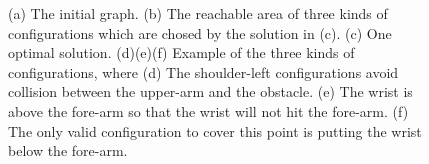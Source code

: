 \documentclass[journal]{IEEEtran}
\begin{document}
\begin{figure}[t]
\centering
{}
\caption{(a) The initial graph. (b) The reachable area of three kinds of configurations which are chosed by the solution in (c). (c) One optimal solution. (d)(e)(f) Example of the three kinds of configurations, where
(d) The shoulder-left configurations avoid collision between the upper-arm and the obstacle. (e) The wrist is above the fore-arm so that the wrist will not hit the fore-arm. (f) The only valid configuration to cover this point is putting the wrist below the fore-arm. }\label{fig_realworld_with}
\end{figure}
\end{document}
